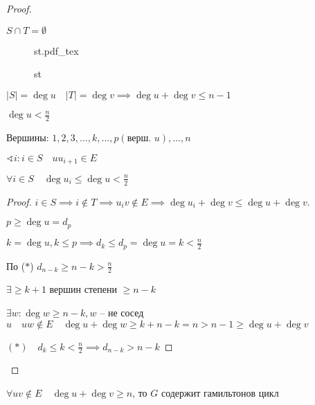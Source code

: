 \documentclass{book}
\renewcommand\O{\ensuremath{\emptyset}}
\theoremstyle{definition}
\newcommand{\incfig}[1]{%
    \def\svgwidth{\columnwidth}
    {#1.pdf_tex}
}
\begin{document}
\begin{proof}
\begin{lemma}
    $S \cap T = \O $ 

\end{lemma}
\begin{figure}[!ht]
    \centering
    \incfig{st}
    \caption{st}
    \label{fig:st}
\end{figure}
\begin{corollary}
    $|S| = \deg u\quad |T| = \deg v \implies \deg u + \deg v \leqslant n-1$
\end{corollary}
     
\begin{corollary}
    $\deg u < \frac{n}{2}$
\end{corollary}

Вершины: $1, 2, 3, \ldots, k, \ldots,  p (\text{верш. }u), \ldots, n$

$\sphericalangle i: i\in S\quad uu_{i+1}\in E$
\begin{lemma}
$\forall i\in S\quad \deg u_i \leqslant  \deg u< \frac{n}{2}$
\end{lemma}
\begin{proof}
    $i\in S \implies i\not\in T \implies u_iv\not\in E\implies \deg u_i+\deg v\leqslant \deg u + \deg v$. 

    $p\geqslant \deg u = d_p$
    
    $k = \deg u, k\leqslant p \implies d_k\leqslant d_p = \deg u = k < \frac{n}{2}$

    По ($\ast$) $d_{n-k} \geqslant  n-k >  \frac{n}{2}$ 

    \begin{lemma}
        $\exists  \geqslant k+1$ вершин степени $ \geqslant  n-k$
    \end{lemma}
    \begin{corollary}
        $\exists w: \deg w\geqslant n-k, w$ -- не сосед $u\quad uw\not\in E\quad \deg u + \deg w \geqslant  k+n-k=n > n-1 \geqslant  \deg u + \deg v$
    \end{corollary}

    $\left( \ast \right) \quad d_k\leqslant k<\frac{n}{2} \implies d_{n-k}>n-k$
\end{proof}
\end{proof}

\begin{theorem}
    [Оре]

    $\forall uv\not\in E\quad\deg u + \deg v \geqslant n$, то $G$ содержит гамильтонов цикл
\end{theorem}
\end{document}
